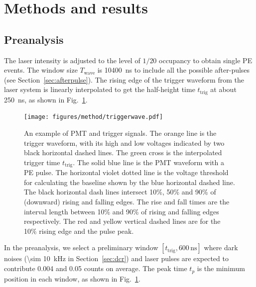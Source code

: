 \section{Methods and results}
\label{Method}
\subsection{Preanalysis}
\label{sec:laserstage}

The laser intensity is adjusted to the level of $1/20$ occupancy to obtain single PE events. The window size $T_{\mathrm{wave}}$ is \SI{10400}{ns} to include all the possible after-pulses (see Section~\ref{sec:afterpulse}). The rising edge of the trigger waveform from the laser system is linearly interpolated to get the half-height time $t_{\mathrm{trig}}$ at about \SI{250}{ns}, as shown in Fig.~\ref{fig:triggertime}.
\begin{figure}[!htbp]
    \centering
    \texttt{[image: figures/method/triggerwave.pdf]}
    \caption{An example of PMT and trigger signals. The orange line is the trigger waveform, with its high and low voltages indicated by two black horizontal dashed lines. The green cross is the interpolated trigger time $t_{\mathrm{trig}}$. The solid blue line is the PMT waveform with a PE pulse. The horizontal violet dotted line is the voltage threshold for calculating the baseline shown by the blue horizontal dashed line. The black horizontal dash lines intersect 10\%, 50\% and 90\% of (downward) rising and falling edges. The rise and fall times are the interval length between 10\% and 90\% of rising and falling edges respectively. The red and yellow vertical dashed lines are for the 10\% rising edge and the pulse peak.}
    \label{fig:triggertime}
\end{figure}


In the preanalysis, we select a preliminary window $[t_{\mathrm{trig}},600\,\mathrm{ns}]$ where dark noises (\SI{\sim 10}{kHz} in Section~\ref{sec:dcr}) and laser pulses are expected to contribute 0.004 and 0.05 counts on average. The peak time $t_p$ is the minimum position in each window, as shown in Fig.~\ref{fig:triggertime}.


